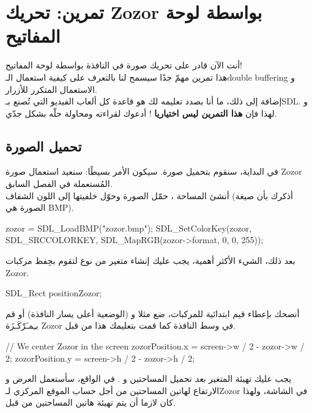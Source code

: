 \section{تمرين: تحريك \textenglish{Zozor} بواسطة لوحة المفاتيح}

أنت الآن قادر على تحريك صورة في النافذة بواسطة لوحة المفاتيح!\\
هذا تمرين مهمّ جدًا سيسمح لنا بالتعرف على كيفية استعمال الـ\textenglish{double buffering}
و الاستعمال المتكرر للأزرار.\\
إضافة إلى ذلك، ما أنا بصدد تعليمه لك هو قاعدة كل ألعاب الفيديو التي تُصنع بـ\textenglish{SDL}.
و لهذا فإن
\textbf{هذا التمرين ليس اختياريا}
! أدعوك لقراءته ومحاولة حلّه بشكل جدّي.

\subsection{تحميل الصورة}

في البداية، سنقوم بتحميل صورة. سيكون الأمر بسيطًا: سنعيد استعمال صورة 
\textenglish{Zozor}
المُستعملة في الفصل السابق.\\
أنشئ المساحة
،
حمّل الصورة وحوّل خلفيتها إلى اللون الشفاف (أذكرك بأن صيغة الصورة هي 
\textenglish{BMP}).

\begin{Csource}
zozor = SDL_LoadBMP("zozor.bmp");
SDL_SetColorKey(zozor, SDL_SRCCOLORKEY, SDL_MapRGB(zozor->format, 0, 0, 255));
\end{Csource}

بعد ذلك، الشيء الأكثر أهمية، يجب عليك إنشاء متغير من نوع
لتقوم بحِفظ مركبات
\textenglish{Zozor}.

\begin{Csource}
SDL_Rect positionZozor;
\end{Csource}

أنصحك بإعطاء قيم ابتدائية للمركبات، ضع مثلا
و 
(الوضعية أعلى يسار النافذة) أو قم بـِمـَرْكَـزَة
\textenglish{Zozor}
في وسط النافذة كما قمت بتعليمك هذا من قبل.

\begin{Csource}
// We center Zozor in the screen
zozorPosition.x = screen->w / 2 - zozor->w / 2;
zozorPosition.y = screen->h / 2 - zozor->h / 2;
\end{Csource}

\begin{critical}
يجب عليك تهيئة المتغير 
\textit{بعد}
تحميل المساحتين 
و 
.
في الواقع، سأستعمل العرض 
و الارتفاع 
لهاتين المساحتين من أجل حساب الموقع المركزي لـ\textenglish{Zozor}
في الشاشة، ولهذا كان لازما أن يتم تهيئة هاتين المساحتين من قبل.
\end{critical}

